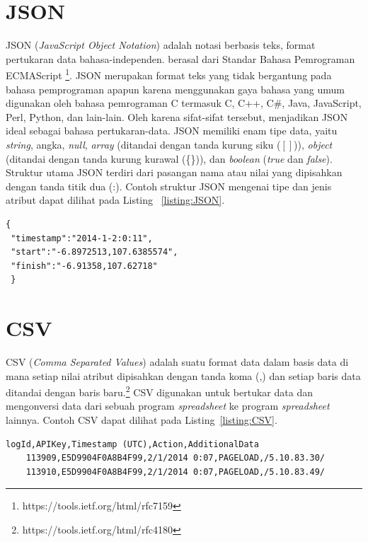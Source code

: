 \section{JSON}
\label{subsec:json}
JSON (\textit{JavaScript Object Notation}) adalah notasi berbasis teks,
   format pertukaran data bahasa-independen. berasal dari
   Standar Bahasa Pemrograman ECMAScript \footnote{https:\slash \slash tools.ietf.org/html/rfc7159}. JSON merupakan format teks yang tidak bergantung pada bahasa pemprograman apapun karena menggunakan gaya bahasa yang umum digunakan oleh bahasa pemrograman C termasuk C, C++, C\#, Java, JavaScript, Perl, Python, dan lain-lain. Oleh karena sifat-sifat tersebut, menjadikan JSON ideal sebagai bahasa pertukaran-data. JSON memiliki enam tipe data, yaitu \textit{string}, angka, \textit{null}, \textit{array} (ditandai dengan tanda kurung siku ($\left [ \right ]$)), \textit{object} (ditandai dengan tanda kurung kurawal (\{\})), dan \textit{boolean} (\textit{true} dan \textit{false}). Struktur utama JSON terdiri dari pasangan nama atau nilai yang dipisahkan dengan tanda titik dua (:). Contoh struktur JSON mengenai tipe dan jenis atribut dapat dilihat pada Listing~ \ref{listing:JSON}.

\begin{lstlisting}[caption=Contoh Struktur JSON, label=listing:JSON]
 {
 "timestamp":"2014-1-2:0:11",
 "start":"-6.8972513,107.6385574",
 "finish":"-6.91358,107.62718"
 }
\end{lstlisting}

\section{CSV}
\label{subsec:csv}
CSV (\textit{Comma Separated Values}) adalah suatu format data dalam basis data di mana setiap nilai atribut dipisahkan dengan tanda koma (,) dan setiap baris data ditandai dengan baris baru.\footnote{https:\slash \slash tools.ietf.org/html/rfc4180} CSV digunakan untuk bertukar data dan mengonversi data dari sebuah program \textit{spreadsheet} ke program \textit{spreadsheet} lainnya. Contoh CSV dapat dilihat pada Listing~\ref{listing:CSV}.

\begin{lstlisting}[caption=Contoh CSV, label=listing:CSV]
    logId,APIKey,Timestamp (UTC),Action,AdditionalData
    113909,E5D9904F0A8B4F99,2/1/2014 0:07,PAGELOAD,/5.10.83.30/
    113910,E5D9904F0A8B4F99,2/1/2014 0:07,PAGELOAD,/5.10.83.49/
\end{lstlisting}
	
